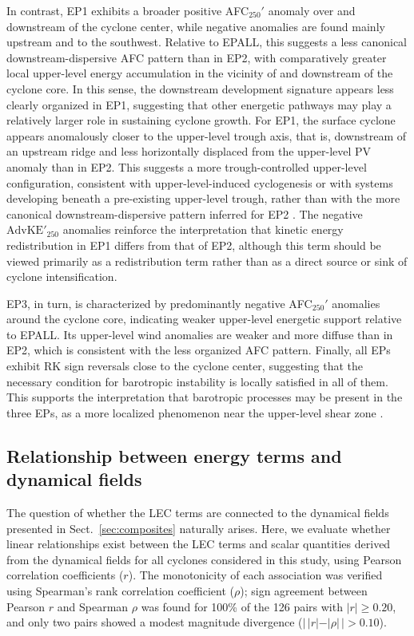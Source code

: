\documentclass[pdflatex,sn-chicago]{sn-jnl}%
\theoremstyle{plain}
\theoremstyle{definition}
\theoremstyle{remark}
\theoremstyle{definition}
\begin{document}
In contrast, EP1 exhibits a broader positive AFC$_{250}'$ anomaly over and downstream of the cyclone center, while negative anomalies are found mainly upstream and to the southwest. Relative to EPALL, this suggests a less canonical downstream-dispersive AFC pattern than in EP2, with comparatively greater local upper-level energy accumulation in the vicinity of and downstream of the cyclone core. In this sense, the downstream development signature appears less clearly organized in EP1, suggesting that other energetic pathways may play a relatively larger role in sustaining cyclone growth. For EP1, the surface cyclone appears anomalously closer to the upper-level trough axis, that is, downstream of an upstream ridge and less horizontally displaced from the upper-level PV anomaly than in EP2. This suggests a more trough-controlled upper-level configuration, consistent with upper-level-induced cyclogenesis or with systems developing beneath a pre-existing upper-level trough, rather than with the more canonical downstream-dispersive pattern inferred for EP2 \citep{schultz2019extratropical,sinclair2000classification,graf2017objective}.
 The negative $\mathrm{AdvKE'}_{250}$ anomalies reinforce the interpretation that kinetic energy redistribution in EP1 differs from that of EP2, although this term should be viewed primarily as a redistribution term rather than as a direct source or sink of cyclone intensification.

EP3, in turn, is characterized by predominantly negative AFC$_{250}'$ anomalies around the cyclone core, indicating weaker upper-level energetic support relative to EPALL. Its upper-level wind anomalies are weaker and more diffuse than in EP2, which is consistent with the less organized AFC pattern. Finally, all EPs exhibit RK sign reversals close to the cyclone center, suggesting that the necessary condition for barotropic instability is locally satisfied in all of them. This supports the interpretation that barotropic processes may be present in the three EPs, as a more localized phenomenon near the upper-level shear zone \citep[e.g.][]{mak1989local,wernli1998effect,cai2004local,riviere2006role}.

\subsection{Relationship between energy terms and dynamical fields}\label{sec:correlation}

The question of whether the LEC terms are connected to the dynamical fields presented in Sect.~\ref{sec:composites} naturally arises. Here, we evaluate whether linear relationships exist between the LEC terms and scalar quantities derived from the dynamical fields for all cyclones considered in this study, using Pearson correlation coefficients ($r$). The monotonicity of each association was verified using
Spearman's rank correlation coefficient ($\rho$); sign agreement between Pearson $r$ and Spearman $\rho$ was found for 100\% of the 126 pairs with $|r| \geq 0.20$, and only two pairs showed a modest magnitude divergence ($|\,|r| - |\rho|\,| > 0.10$). 
\end{document}
